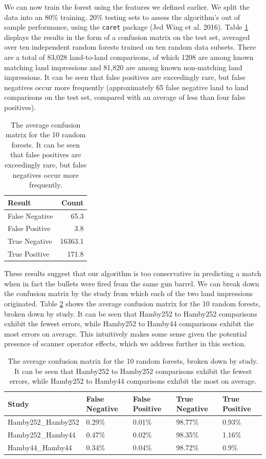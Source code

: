 \documentclass[12pt,]{article}
\theoremstyle{definition}
\theoremstyle{definition}
\theoremstyle{definition}
\theoremstyle{remark}
\begin{document}
We can now train the forest using the features we defined earlier. We
split the data into an 80\% training, 20\% testing sets to assess the
algorithm's out of sample performance, using the \texttt{caret} package
(Jed Wing et al. 2016). Table \ref{tab:avgforest} displays the results
in the form of a confusion matrix on the test set, averaged over ten
independent random forests trained on ten random data subsets. There are
a total of 83,028 land-to-land comparisons, of which 1208 are among
known matching land impressions and 81,820 are among known non-matching
land impressions. It can be seen that false positives are exceedingly
rare, but false negatives occur more frequently (approximately 65 false
negative land to land comparisons on the test set, compared with an
average of less than four false positives).

\begin{table}[H]
\centering
\begin{tabular}{lr}
  \hline
Result & Count \\ 
  \hline
False Negative & 65.3 \\ 
  False Positive & 3.8 \\ 
  True Negative & 16363.1 \\ 
  True Positive & 171.8 \\ 
   \hline
\end{tabular}
\caption{The average confusion matrix for the 10 random forests. It can be seen that false positives are exceedingly rare, but false negatives occur more frequently.} 
\label{tab:avgforest}
\end{table}

These results suggest that our algorithm is too conservative in
predicting a match when in fact the bullets were fired from the same gun
barrel. We can break down the confusion matrix by the study from which
each of the two land impressions originated. Table
\ref{tab:avgforeststudy} shows the average confusion matrix for the 10
random forests, broken down by study. It can be seen that Hamby252 to
Hamby252 comparisons exhibit the fewest errors, while Hamby252 to
Hamby44 comparisons exhibit the most errors on average. This intuitively
makes some sense given the potential presence of scanner operator
effects, which we address further in this section.

\begin{table}[H]
\centering
\begin{tabular}{lllll}
  \hline
Study & False Negative & False Positive & True Negative & True Positive \\ 
  \hline
Hamby252\_Hamby252 & 0.29\% & 0.01\% & 98.77\% & 0.93\% \\ 
  Hamby252\_Hamby44 & 0.47\% & 0.02\% & 98.35\% & 1.16\% \\ 
  Hamby44\_Hamby44 & 0.34\% & 0.04\% & 98.72\% & 0.9\% \\ 
   \hline
\end{tabular}
\caption{The average confusion matrix for the 10 random forests, broken down by study. It can be seen that Hamby252 to Hamby252 comparisons exhibit the fewest errors, while Hamby252 to Hamby44 comparisons exhibit the most on average.} 
\label{tab:avgforeststudy}
\end{table}
\end{document}

